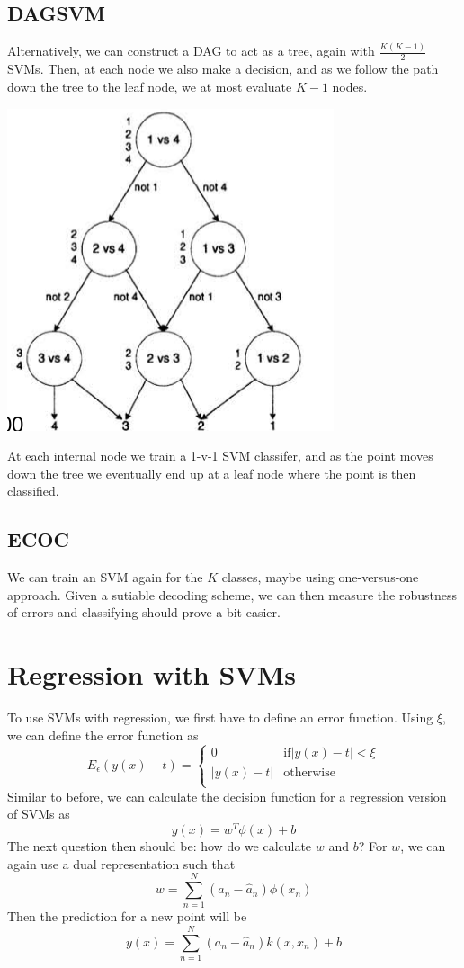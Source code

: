 \documentclass{tufte-handout}
\begin{document}
		\subsection{DAGSVM}
		Alternatively, we can construct a DAG to act as a tree, again with $\frac{K(K-1)}{2}$ SVMs. Then,
		at each node we also make a decision, and as we follow the path down the tree to the leaf node,
		we at most evaluate $K-1$ nodes.
		\begin{marginfigure}
				\includegraphics[scale=0.4]{dagsvm}
				\caption{At each internal node we train a 1-v-1 SVM classifer, and as the point
				moves down the tree we eventually end up at a leaf node where the point is then
				classified.}
		\end{marginfigure}

		\subsection{ECOC}
		We can train an SVM again for the $K$ classes, maybe using one-versus-one approach. Given a sutiable
		decoding scheme, we can then measure the robustness of errors and classifying should prove a bit easier.

\section{Regression with SVMs}
	To use SVMs with regression, we first have to define an error function. Using $\xi$, we can define the
	error function as
	\[ E_{\epsilon}(y(x) - t) = 
		\begin{cases}
			0 & \textrm{if} |y(x) -t |<\xi \\
			|y(x)-t | & \textrm{otherwise} \\
		\end{cases}
	\]
	Similar to before, we can calculate the decision function for a regression version of SVMs as
	\[ y(x) = w^{T}\phi(x) + b\]
	The next question then should be: how do we calculate $w$ and $b$?
	For $w$, we can again use a dual representation such that 
	\[ w = \sum_{n=1}^{N}(a_{n} - \hat{a}_{n})\phi(x_{n})\]
	Then the prediction for a new point will be 
	\[y(x) = \sum_{n=1}^{N}(a_{n} - \hat{a}_{n})k(x, x_{n}) + b\]
\end{document}
